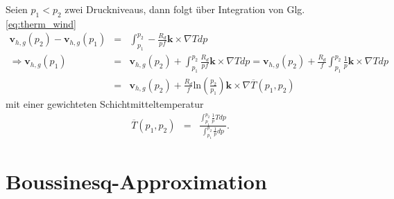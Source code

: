 \documentclass{book}
\newcommand\newoverline[1]{%
\overline{#1}}
\renewcommand{\ln}{\text{ln}}
\begin{document}
Seien $p_1 < p_2$ zwei Druckniveaus, dann folgt über Integration von Glg. \eqref{eq:therm_wind}
%
\begin{eqnarray}
\mathbf{v}_{h, g}\left(p_2\right) - \mathbf{v}_{h, g}\left(p_1\right) & = & \int_{p_1}^{p_2}-\frac{R_d}{pf}\mathbf{k}\times\nabla Tdp\nonumber\\
\Rightarrow\mathbf{v}_{h, g}\left(p_1\right) & = & \mathbf{v}_{h, g}\left(p_2\right) + \int_{p_1}^{p_2}\frac{R_d}{pf}\mathbf{k}\times\nabla Tdp = \mathbf{v}_{h, g}\left(p_2\right) + \frac{R_d}{f}\int_{p_1}^{p_2}\frac{1}{p}\mathbf{k}\times\nabla Tdp\nonumber\\
& = & \mathbf{v}_{h, g}\left(p_2\right) + \frac{R_d}{f}\ln\left(\frac{p_2}{p_1}\right)\mathbf{k}\times\nabla\newoverline{T}\left(p_1, p_2\right)
\end{eqnarray}
%
mit einer gewichteten Schichtmitteltemperatur
%
\begin{eqnarray}
\newoverline{T}\left(p_1, p_2\right) & = & \frac{\int_{p_1}^{p_2}\frac{1}{p}Tdp}{\int_{p_1}^{p_2}\frac{1}{p}dp}.
\end{eqnarray}

\section{Boussinesq-Approximation}
\label{sec:boussinesq-approximation}
\end{document}
